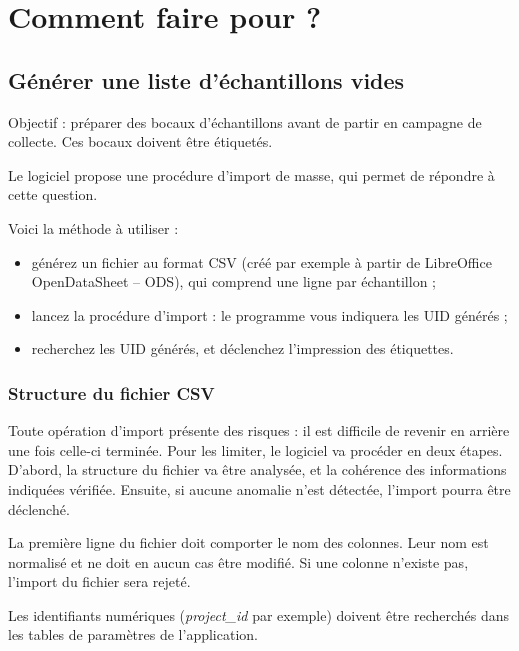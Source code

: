 \chapter{Comment faire pour ?}
\section{Générer une liste d'échantillons vides}
Objectif : préparer des bocaux d'échantillons avant de partir en campagne de collecte. Ces bocaux doivent être étiquetés.

Le logiciel propose une procédure d'import de masse, qui permet de répondre à cette question.

Voici la méthode à utiliser :
\begin{itemize}
\item générez un fichier au format CSV (créé par exemple à partir de LibreOffice OpenDataSheet -- ODS), qui comprend une ligne par échantillon ;
\item lancez la procédure d'import : le programme vous indiquera les UID générés ;
\item recherchez les UID générés, et déclenchez l'impression des étiquettes.
\end{itemize}

\subsection{Structure du fichier CSV}

Toute opération d'import présente des risques : il est difficile de revenir en arrière une fois celle-ci terminée.
Pour les limiter, le logiciel va procéder en deux étapes. D'abord, la structure du fichier va être analysée, et la cohérence des informations indiquées vérifiée.
Ensuite, si aucune anomalie n'est détectée, l'import pourra être déclenché.

La première ligne du fichier doit comporter le nom des colonnes. Leur nom est normalisé et ne doit en aucun cas être modifié. Si une colonne n'existe pas, l'import du fichier sera rejeté.

Les identifiants numériques (\textit{project\_id} par exemple) doivent être recherchés dans les tables de paramètres de l'application.


